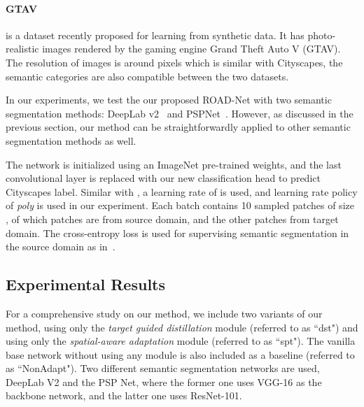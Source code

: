 \documentclass[10pt,twocolumn,letterpaper]{article}
\begin{document}
\vspace{-4mm}

\paragraph{GTAV} is a dataset recently proposed for learning from synthetic data. It has  photo-realistic images rendered by the gaming engine Grand Theft Auto V (GTAV). The resolution of images is around  pixels which is similar with Cityscapes, the semantic categories are also compatible between the two datasets.

In our experiments, we test the our proposed ROAD-Net with two semantic segmentation methods: DeepLab v2~\cite{chen2016deeplab} and PSPNet~\cite{zhao2016pyramid}. However, as discussed in the previous section, our method can be straightforwardly applied to other semantic segmentation methods as well. 

The network is initialized using an ImageNet pre-trained weights, and the last convolutional layer is replaced with our new classification head to predict Cityscapes label. Similar with \cite{chen2016deeplab}, a learning rate of  is used, and learning rate policy of \textit{poly} is used in our experiment. Each batch contains 10 sampled patches of size , of which  patches are from source domain, and the other  patches from target domain. The cross-entropy loss is used for supervising semantic segmentation in the source domain as in~\cite{long2015fully,chen2016deeplab}. 


\subsection{Experimental Results}
\label{sec:exp_results}
For a comprehensive study on our method, we include two variants of our method, using only the \textit{target guided distillation} module (referred to as ``dst") and using  only the \textit{spatial-aware adaptation} module (referred to as ``spt"). The vanilla base network without using any module is also included as a baseline (referred to as ``NonAdapt"). Two different semantic segmentation networks are used, DeepLab V2 and the PSP Net, where the former one uses VGG-16 as the backbone network, and the latter one uses ResNet-101. 
\end{document}
